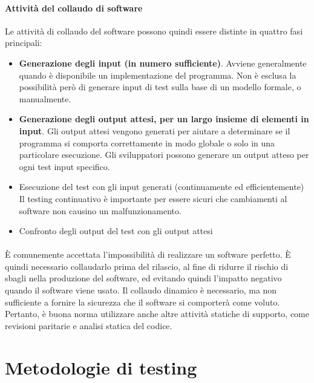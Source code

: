 \paragraph{Attività del collaudo di software}
Le attività di collaudo del software possono quindi essere distinte in quattro fasi principali:
\begin{itemize}
\item \textbf{Generazione degli input (in numero sufficiente)}. Avviene generalmente quando è disponibile un implementazione del programma. Non è esclusa la possibilità però di generare input di test sulla base di un modello formale\cite{DickFaivre93}, o manualmente.
\cite{XieDissertation}
\item \textbf{Generazione degli output attesi, per un largo insieme di elementi in input}. Gli output attesi vengono generati per aiutare a determinare se il programma si comporta correttamente in modo globale o solo in una particolare esecuzione. Gli sviluppatori possono generare un output atteso per ogni test input specifico.
\cite{XieDissertation}\cite{Panzl78}
\item Esecuzione del test con gli input generati (continuamente ed efficientemente) Il testing continuativo è importante per essere sicuri che cambiamenti al software non causino un malfunzionamento.
\cite{XieDissertation}
\item Confronto degli output del test con gli output  attesi
\cite{XieDissertation}
\end{itemize}
\paragraph{}
È comunemente accettata l'impossibilità di realizzare un software perfetto. È quindi necessario collaudarlo prima del rilascio, al fine di ridurre il rischio di sbagli nella produzione del software, ed evitando quindi l'impatto negativo quando il software viene usato.
Il collaudo dinamico è necessario, ma non sufficiente a fornire la sicurezza che il software si comporterà come voluto. Pertanto, è buona norma utilizzare anche altre attività statiche di supporto, come revisioni paritarie e analisi statica del codice.\cite{iso29119}
\section{Metodologie di testing}
